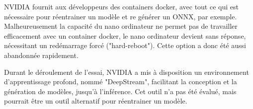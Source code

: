 \par NVIDIA fournit aux développeurs des containers docker, avec tout ce qui est nécessaire pour réentrainer un modèle et re générer un ONNX, par exemple. Malheureusement la capacité du nano ordinateur ne permet pas de travailler efficacement avec un container docker, le nano ordinateur devient sans réponse, nécessitant un redémarrage forcé ("hard-reboot"). Cette option a donc été aussi abandonnée rapidement. 
\par Durant le déroulement de l'essai, NVIDIA a mis à disposition un environnement d'apprentissage profond, nommé "DeepStream", facilitant la conception et la génération de modèles, jusqu'à l'inférence. Cet outil n'a pas été évalué, mais pourrait être un outil alternatif pour réentrainer un modèle.